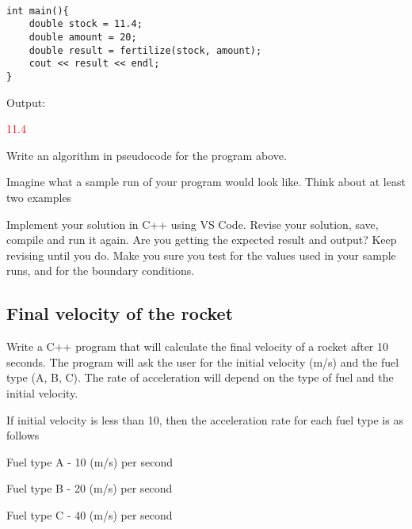 \begin{sample}
\begin{verbatim}

int main(){
    double stock = 11.4;
    double amount = 20;
    double result = fertilize(stock, amount);
    cout << result << endl;
}
\end{verbatim}
    Output:
    
    \textcolor{red}{11.4}
    
\end{sample}


\begin{multipart}
    Write an algorithm in pseudocode for the program above.
\end{multipart}

\vspace{1.5cm}

\begin{multipart}
    Imagine what a sample run of your program would look like. Think about at least two examples

\end{multipart}

\vspace{2cm}

\begin{multipart}
     Implement your solution in C++ using VS Code. Revise your solution, save, compile and run it again. Are you getting the expected result and output? Keep revising until you do. Make you sure you test for the values used in your sample runs, and for the boundary conditions.
\end{multipart}

\subsection{Final velocity of the rocket}
Write a C++ program that will calculate the final velocity of a rocket after 10 seconds. The program will ask the user for the initial velocity (m/s) and the fuel type (A, B, C). The rate of acceleration will depend on the type of fuel and the initial velocity.

\vspace{0.5cm}
If initial velocity is less than 10, then the acceleration rate for each fuel type is as follows

    Fuel type A - 10 (m/s) per second
    
    Fuel type B - 20 (m/s) per second
    
    Fuel type C - 40 (m/s) per second
    
